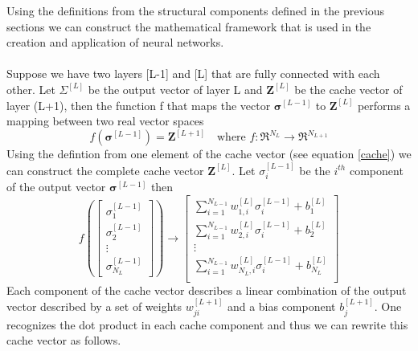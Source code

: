 \documentclass[12pt]{article}
\begin{document}
Using the definitions from the structural components defined in the previous sections we can construct the mathematical framework that is used in the creation and application of neural networks.
\\ 
\\
Suppose we have two layers [L-1] and [L] that are fully connected with each other. Let $\Sigma^{[L]}$ be the output vector of layer L and $\textbf{Z}^{[L]}$ be the cache vector of layer (L+1), then the function f that maps the vector $\bm{\sigma}^{[L-1]}$ to $\textbf{Z}^{[L]}$ performs a mapping between two real vector spaces 	
\begin{equation}
f(\bm{\sigma}^{[L-1]}) = \textbf{Z}^{[L+1]} \quad \text{where } f:\Re^{N_L} \rightarrow \Re^{N_{L+1}}
\end{equation}
Using the defintion from one element of the cache vector (see equation \ref{cache}) we can construct the complete cache vector $\textbf{Z}^{[L]}$. Let $\sigma^{[L-1]}_i$ be the $i^{th}$ component of the output vector $\bm{\sigma}^{[L-1]}$ then
\begin{equation}
f\left(
\begin{bmatrix}
\sigma^{[L-1]}_1 \\
\sigma^{[L-1]}_2 \\
\vdots \\
\sigma^{[L-1]}_{N_L}
\end{bmatrix}
\right)	
\rightarrow
\begin{bmatrix}
\sum_{i=1}^{N_{L-1}}w_{1,i}^{[L]}\sigma_{i}^{[L-1]} + b^{[L]}_1 \\
\sum_{i=1}^{N_{L-1}}w_{2,i}^{[L]}\sigma_{i}^{[L-1]} + b^{[L]}_2 \\
\vdots \\
\sum_{i=1}^{N_{L-1}}w_{N_{L},i}^{[L]}\sigma_{i}^{[L-1]} + b^{[L]}_{N_{L}} \\
\end{bmatrix}
\end{equation}
Each component of the cache vector describes a linear combination of the output vector described by a set of weights $w_{ji}^{[L+1]}$ and a bias component $b_j^{[L+1]}$. One recognizes the dot product in each cache component and thus we can rewrite this cache vector as follows.  
\end{document}
